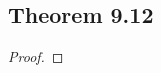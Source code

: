 \documentclass[../../main.tex]{subfiles}
\begin{document}
\subsection{Theorem 9.12}
\begin{wts}

\end{wts}
\begin{proof}

\end{proof}
\end{document}
